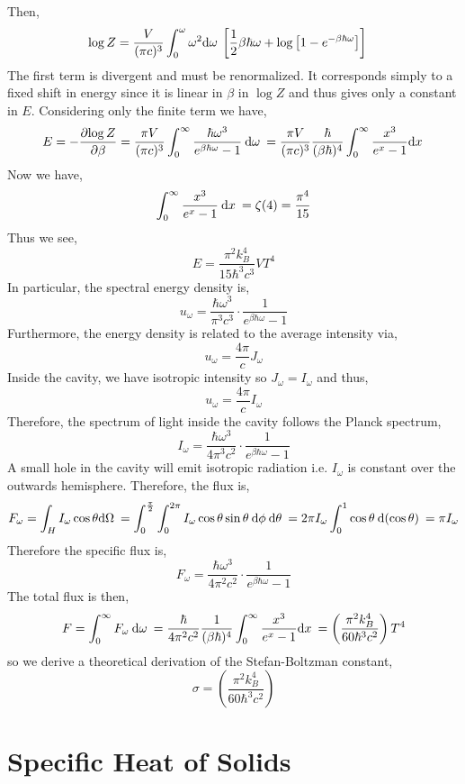 \documentclass[12pt]{article}
\begin{document}
Then,
\begin{align*}
\log{Z} & = \frac{V}{(\pi c)^3} \int_0^\omega \omega^2 \mathrm{d}\omega \: \left[ \frac{1}{2} \beta \hbar \omega + \log{\left[1 - e^{-\beta \hbar \omega} \right]}  \right]
\end{align*}
The first term is divergent and must be renormalized. It corresponds simply to a fixed shift in energy since it is linear in $\beta$ in $\log{Z}$ and thus gives only a constant in $E$. Considering only the finite term we have,
\begin{align*}
E = - \frac{\partial{\log{Z}}}{\partial{\beta}} = \frac{\pi V}{(\pi c)^3} \int_0^\infty \frac{\hbar \omega^3 }{e^{\beta \hbar \omega} - 1} \: \mathrm{d}\omega \: = \frac{\pi V}{(\pi c)^3} \frac{\hbar}{(\beta \hbar)^4} \int_0^\infty \frac{x^3}{e^x - 1} \mathrm{d}x \: 
\end{align*}
Now we have, 
\[ \int_0^\infty \frac{x^3}{e^x - 1} \: \mathrm{d}x \: = \zeta(4) = \frac{\pi^4}{15} \]
Thus we see,
\[ E = \frac{\pi^2 k_B^4}{15 \hbar^3 c^3}  V T^4 \]
In particular, the spectral energy density is,
\[ u_\omega = \frac{\hbar \omega^3}{\pi^3 c^3} \cdot \frac{1}{e^{\beta \hbar \omega} - 1} \]
Furthermore, the energy density is related to the average intensity via,
\[ u_\omega = \frac{4 \pi}{c} J_\omega \]
Inside the cavity, we have isotropic intensity so $J_\omega = I_\omega$ and thus,
\[ u_\omega = \frac{4 \pi}{c} I_\omega \]
Therefore, the spectrum of light inside the cavity follows the Planck spectrum,
\[ I_\omega = \frac{\hbar \omega^3}{4 \pi^3 c^2} \cdot \frac{1}{e^{\beta \hbar \omega} - 1} \]
A small hole in the cavity will emit isotropic radiation i.e. $I_\omega$ is constant over the outwards hemisphere. Therefore, the flux is,
\[ F_\omega = \int_{H} I_\omega \cos{\theta} \mathrm{d}\Omega \: = \int_0^{\frac{\pi}{2}} \int_0^{2 \pi} I_\omega \cos{\theta} \sin{\theta} \: \mathrm{d}\phi \: \mathrm{d}\theta \: = 2 \pi I_\omega \int_0^1 \cos{\theta} \: \mathrm{d}(\cos{\theta}) \: = \pi I_\omega \]
Therefore the specific flux is,
\[ F_\omega = \frac{\hbar \omega^3}{4 \pi^2 c^2} \cdot \frac{1}{e^{\beta \hbar \omega} - 1} \]
The total flux is then,
\[ F = \int_0^\infty F_\omega \: \mathrm{d}\omega \: = \frac{\hbar}{4\pi^2 c^2} \frac{1}{(\beta \hbar)^4} \int_0^\infty \frac{x^3}{e^x - 1} \mathrm{d}x \: = \left( \frac{\pi^2 k_B^4}{60 \hbar^3 c^2} \right)  T^4 \] 
so we derive a theoretical derivation of the Stefan-Boltzman constant,
\[ \sigma = \left( \frac{\pi^2 k_B^4}{60 \hbar^3 c^2} \right) \]

\section{Specific Heat of Solids}
\end{document}
